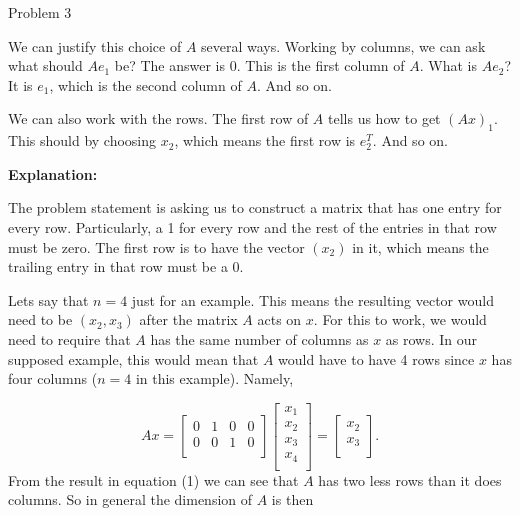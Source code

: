 \begin{problem}{Problem 3}
\begin{Highlight}[Solution]
        We can justify this choice of $A$ several ways. Working by columns, we can ask what should $Ae_{1}$ be? The answer is 0. This is the first column of $A$. What is $Ae_{2}$? It is $e_{1}$, which 
        is the second column of $A$. And so on.

        We can also work with the rows. The first row of $A$ tells us how to get $(Ax)_{1}$. This should by choosing $x_{2}$, which means the first row is $e^{T}_{2}$. And so on. \vspace*{1em}

        \noindent \textbf{Explanation:} \vspace*{1em}

        The problem statement is asking us to construct a matrix that has one entry for every row. Particularly, a 1 for every row and the rest of the entries in that row must be zero. The first row is
        to have the vector $(x_{2})$ in it, which means the trailing entry in that row must be a 0.

        Lets say that $n=4$ just for an example. This means the resulting vector would need to be $(x_{2},x_{3})$ after the matrix $A$ acts on $x$. For this to work, we would need to require that $A$ has
        the same number of columns as $x$ as rows. In our supposed example, this would mean that $A$ would have to have 4 rows since $x$ has four columns ($n = 4$ in this example). Namely,

        \setcounter{equation}{0}
        \begin{equation}
            Ax = 
            \begin{bmatrix}
                0 & 1 & 0 & 0 \\
                0 & 0 & 1 & 0 \\
            \end{bmatrix}
            \begin{bmatrix}
                x_{1} \\
                x_{2} \\
                x_{3} \\
                x_{4} \\
            \end{bmatrix}
            = 
            \begin{bmatrix}
                x_{2} \\
                x_{3} \\
            \end{bmatrix}.
        \end{equation}
        From the result in equation (1) we can see that $A$ has two less rows than it does columns. So in general the dimension of $A$ is then


\end{Highlight}
\end{problem}
